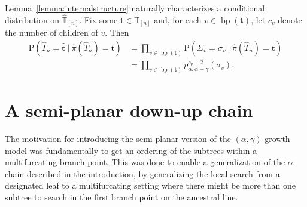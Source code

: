 \documentclass[a4paper, final]{amsart}
\theoremstyle{plain}
\theoremstyle{definition}
\newcommand{\tree}[1][t]{\boldsymbol{#1}}
\newcommand{\that}[1][t]{\hat{\boldsymbol{#1}}} %
\newcommand{\That}[1][T]{\widehat{#1}}
\newcommand{\Thatspace}[1][\T]{\widehat{\boldsymbol{#1}}} %
\newcommand{\T}{\mathbb{T}}
\DeclareMathOperator{\branchpoints}{bp}
\renewcommand{\P}{\mathrm{P}}
\begin{document}
%
Lemma~\ref{lemma:internalstructure} naturally characterizes a conditional distribution on $\Thatspace_{[n]}$.
Fix some $\tree \in \T_{[n]}$ and, for each $v \in \branchpoints(\tree)$, let $c_v$ denote the number of children of $v$.
Then
%
\begin{align}
  \label{eq:condprop_planargivenshape}
  \P \left( \That_n = \that \ \bigg\vert \ \hat{\pi} \left( \That_n \right) = \tree \right) 
  &= \prod_{v \in \branchpoints(\tree)} \P \left( \Sigma_v = \sigma_v \ \bigg\vert \ \hat{\pi} \left( \That_n \right) = \tree \right) \\
  &= \prod_{v \in \branchpoints(\tree)} p^{c_v-2}_{\alpha, \alpha - \gamma} \left( \sigma_v \right) \nonumber.
\end{align}
%
%
\section{A semi-planar down-up chain}
%
The motivation for introducing the semi-planar version of the $(\alpha, \gamma)$-growth model was fundamentally to get an ordering of the subtrees within a multifurcating branch point.
This was done to enable a generalization of the $\alpha$-chain described in the introduction, by generalizing the local search from a designated leaf to a multifurcating setting where there might be more than one subtree to search in the first branch point on the ancestral line.
\end{document}
